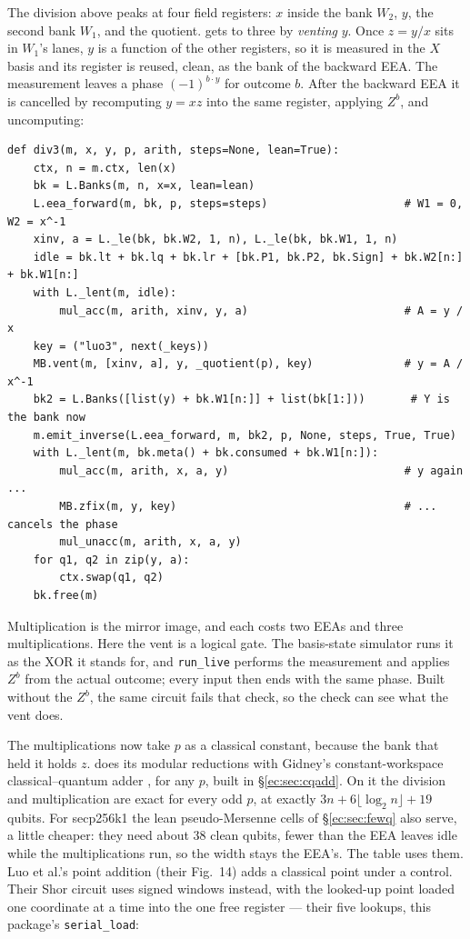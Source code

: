 \documentclass[11pt]{article}
\theoremstyle{plain}
\theoremstyle{remark}
\begin{document}
The division above peaks at four field registers: $x$ inside the bank $W_2$, $y$, the second bank
$W_1$, and the quotient. \cite{ec:luo26} gets to three by \emph{venting} $y$. Once $z=y/x$ sits in
$W_1$'s lanes, $y$ is a function of the other registers, so it is measured in the $X$ basis and
its register is reused, clean, as the bank of the backward EEA. The measurement leaves a phase
$(-1)^{b\cdot y}$ for outcome $b$. After the backward EEA it is cancelled by recomputing $y=xz$
into the same register, applying $Z^b$, and uncomputing:
\begin{lstlisting}
def div3(m, x, y, p, arith, steps=None, lean=True):
    ctx, n = m.ctx, len(x)
    bk = L.Banks(m, n, x=x, lean=lean)
    L.eea_forward(m, bk, p, steps=steps)                     # W1 = 0, W2 = x^-1
    xinv, a = L._le(bk, bk.W2, 1, n), L._le(bk, bk.W1, 1, n)
    idle = bk.lt + bk.lq + bk.lr + [bk.P1, bk.P2, bk.Sign] + bk.W2[n:] + bk.W1[n:]
    with L._lent(m, idle):
        mul_acc(m, arith, xinv, y, a)                        # A = y / x
    key = ("luo3", next(_keys))
    MB.vent(m, [xinv, a], y, _quotient(p), key)              # y = A / x^-1
    bk2 = L.Banks([list(y) + bk.W1[n:]] + list(bk[1:]))       # Y is the bank now
    m.emit_inverse(L.eea_forward, m, bk2, p, None, steps, True, True)
    with L._lent(m, bk.meta() + bk.consumed + bk.W1[n:]):
        mul_acc(m, arith, x, a, y)                           # y again ...
        MB.zfix(m, y, key)                                   # ... cancels the phase
        mul_unacc(m, arith, x, a, y)
    for q1, q2 in zip(y, a):
        ctx.swap(q1, q2)
    bk.free(m)
\end{lstlisting}
Multiplication is the mirror image, and each costs two EEAs and three multiplications. Here the
vent is a logical gate. The basis-state simulator runs it as the XOR it stands for, and
\texttt{run\_live} performs the measurement and applies $Z^b$ from the actual outcome; every input
then ends with the same phase. Built without the $Z^b$, the same circuit fails that check, so the
check can see what the vent does.

The multiplications now take $p$ as a classical constant, because the bank that held it holds $z$.
\cite{ec:luo26} does its modular reductions with Gidney's constant-workspace classical--quantum
adder \cite{ec:gidney25}, for any $p$, built in \S\ref{ec:sec:cqadd}. On it the division and
multiplication are exact for every odd $p$, at exactly $3n+6\lfloor\log_2n\rfloor+19$ qubits. For
secp256k1 the lean pseudo-Mersenne cells of \S\ref{ec:sec:fewq} also serve, a little cheaper: they
need about $38$ clean qubits, fewer than the EEA leaves idle while the multiplications run, so the
width stays the EEA's. The table uses them. Luo et al.'s point addition (their Fig.~14)
adds a classical point under a control. Their Shor circuit uses signed windows instead, with the
looked-up point loaded one coordinate at a time into the one free register --- their five lookups,
this package's \texttt{serial\_load}:
\end{document}
